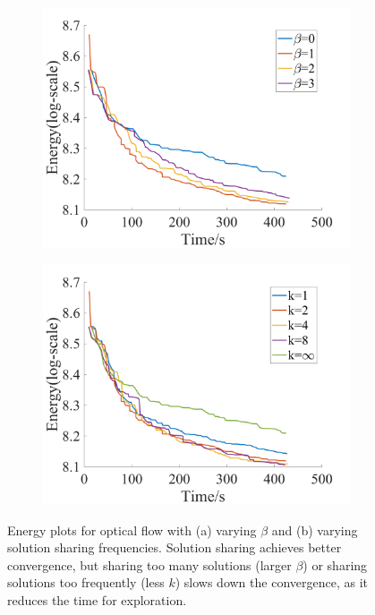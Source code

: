 \begin{figure}[tb]
  \centering
  \begin{subfigure}[b]{0.49\columnwidth}
    \centering
    \includegraphics[width=\columnwidth]{figure/optical_flow_by_beta.png}
    \caption{}
    \label{fig:optical_flow_by_beta}
  \end{subfigure}  
  \begin{subfigure}[b]{0.49\columnwidth}
    \centering
    \includegraphics[width=\columnwidth]{figure/optical_flow_by_interval.png}
    \caption{}
    \label{fig:optical_flow_by_interval}
  \end{subfigure}
  \caption{Energy plots for optical flow with (a) varying
    $\beta$ and (b) varying solution sharing
    frequencies. Solution sharing achieves better convergence, but sharing too many solutions (larger $\beta$) or sharing solutions too frequently (less $k$) slows down the convergence, as it reduces the time for exploration.}
\end{figure}
